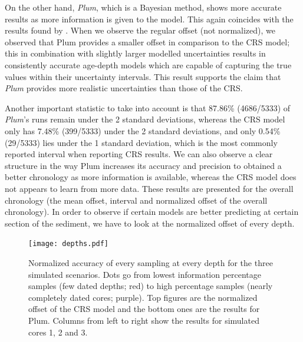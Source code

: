 \documentclass [10pt] {article}
\begin{document}
On the other hand, \textit{Plum}, which is a Bayesian method, shows more accurate results as more information is given to the model.
This again coincides with the results found by \citet{Blaauw2018}. 
When we observe the regular offset (not normalized), we observed that Plum provides a smaller offset in comparison to the CRS model; this in combination with slightly larger modelled uncertainties results in consistently accurate age-depth models which are capable of capturing the true values within their uncertainty intervals. 
This result supports the claim that \textit{Plum} provides more realistic uncertainties than those of the CRS. 



	Another important statistic to take into account is that 87.86\% (4686/5333) of \textit{Plum}'s runs remain under the 2 standard deviations, whereas the CRS model only has 7.48\% (399/5333) under the 2 standard deviations, and only 0.54\% (29/5333) lies under the 1 standard deviation, which is the most commonly reported interval when reporting CRS results.
We can also observe a clear structure in the way Plum increases its accuracy and precision to obtained a better chronology as more information is available, whereas the CRS model does not appears to learn from more data. 
These results are presented for the overall chronology (the mean offset, interval and normalized offset of the overall chronology). 
In order to observe if certain models are better predicting at certain section of the sediment, we have to look at the normalized offset of every depth. 


\begin{figure}[!]
	\begin{centering}
		\texttt{[image: depths.pdf]}
		\caption{Normalized accuracy of every sampling at every depth for the three simulated scenarios. Dots go from lowest information percentage samples (few dated depths; red) to high percentage samples (nearly completely dated cores; purple). Top figures are the normalized offset of the CRS model and the bottom ones are the results for Plum. Columns from left to right show the results for simulated cores 1, 2 and 3.}
		\label{fig:depths}
	\end{centering}
\end{figure}
\end{document}
